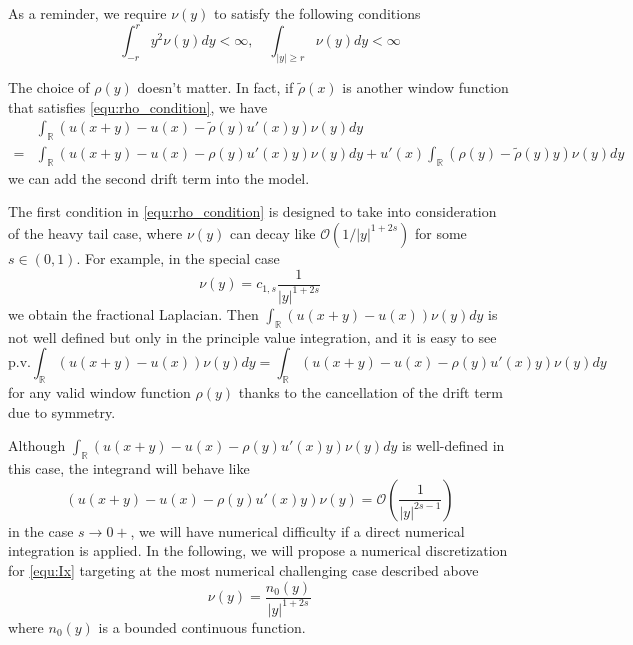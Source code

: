 \documentclass[10pt,a4paper]{article}
\newcommand{\RR}[0]{\mathbb{R}}
\theoremstyle{definition}
\begin{document}
As a reminder, we require $\nu(y)$ to satisfy the following conditions
\begin{equation}\label{equ:ny}
	\int_{-r}^ry^2\nu(y)dy <\infty, \quad \int_{|y|\geq r} \nu(y)dy<\infty
\end{equation} 

The choice of $\rho(y)$ doesn't matter. In fact, if $\tilde\rho(x)$ is another window function that satisfies \cref{equ:rho_condition}, we have
\begin{align}
	&\int_{\RR}(u(x+y)-u(x)-\tilde\rho(y)u'(x)y)\nu(y)dy \\
	=& \int_{\RR}(u(x+y)-u(x)-\rho(y)u'(x)y)\nu(y)dy + u'(x)\int_{\RR}(\rho(y)-\tilde\rho(y)y)\nu(y)dy
\end{align}
we can add the second drift term into the model. 

The first condition in \cref{equ:rho_condition} is designed to take into consideration of the heavy tail case, where $\nu(y)$ can decay like $\mathcal{O}(1/|y|^{1+2s})$ for some $s\in (0,1)$. For example, in the special case
\begin{equation}
	\nu(y) = c_{1,s}\frac{1}{|y|^{1+2s}}
\end{equation}
we obtain the fractional Laplacian. Then $\int_{\RR}(u(x+y)-u(x))\nu(y)dy$ is not well defined but only in the principle value integration, and it is easy to see
\begin{equation}
	\mathrm{p.v.}\int_{\RR}(u(x+y)-u(x))\nu(y)dy = \int_{\RR}(u(x+y)-u(x)-\rho(y)u'(x)y)\nu(y)dy
\end{equation}
for any valid window function $\rho(y)$ thanks to the cancellation of the drift term due to symmetry. 

Although $\int_{\RR}(u(x+y)-u(x)-\rho(y)u'(x)y)\nu(y)dy$ is well-defined in this case, the integrand will behave like 
\begin{equation}
	(u(x+y)-u(x)-\rho(y)u'(x)y)\nu(y) = \mathcal{O}\left(\frac{1}{|y|^{2s-1}}\right)
\end{equation}
in the case $s\rightarrow 0+$, we will have numerical difficulty if a direct numerical integration is applied. In the following, we will propose a numerical discretization for \cref{equ:Ix} targeting at the most numerical challenging case described above 
\begin{equation}\label{equ:ny2}
	\nu(y) = \frac{n_0(y)}{|y|^{1+2s}}
\end{equation} 
where $n_0(y)$ is a bounded continuous function. 
\end{document}
